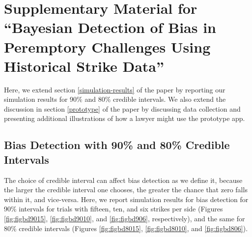 \documentclass[12pt]{article}
\begin{document}
\hypertarget{supplementary-material-for-bayesian-detection-of-bias-in-peremptory-challenges-using-historical-strike-data}{%
\section{Supplementary Material for ``Bayesian Detection of Bias in Peremptory Challenges Using Historical Strike Data''}\label{supplementary-material-for-bayesian-detection-of-bias-in-peremptory-challenges-using-historical-strike-data}}

Here, we extend section \ref{simulation-results} of the paper by reporting our simulation results for 90\% and 80\% credible intervals. We also extend the discussion in section \ref{prototype} of the paper by discussing data collection and presenting additional illustrations of how a lawyer might use the prototype app.

\hypertarget{bias-detection-with-90-and-80-credible-intervals}{%
\subsection{Bias Detection with 90\% and 80\% Credible Intervals}\label{bias-detection-with-90-and-80-credible-intervals}}

The choice of credible interval can affect bias detection as we define it, because the larger the credible interval one chooses, the greater the chance that zero falls within it, and vice-versa. Here, we report simulation results for bias detection for 90\% intervals for trials with fifteen, ten, and six strikes per side (Figures \ref{fig:figbd9015}, \ref{fig:figbd9010}, and \ref{fig:figbd906}, respectively), and the same for 80\% credible intervals (Figures \ref{fig:figbd8015}, \ref{fig:figbd8010}, and \ref{fig:figbd806}).
\end{document}
